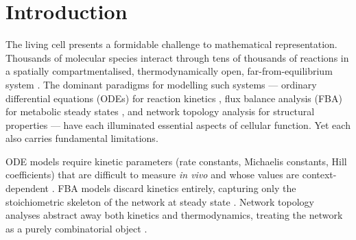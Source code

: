 \documentclass[11pt,twocolumn]{article}
\theoremstyle{plain}
\theoremstyle{definition}
\begin{document}
\begin{abstract}
We demonstrate that the contact state is the unique privileged state of a
biochemical network from which all other states can be derived by partition
depth inflation (perturbation). Disease states, drug responses, and metabolic
shifts correspond to departures from contact, measurable as increased partition
depth along specific edges. We present algorithms for computing contact maps
from pathway databases, for backward navigation through the causal chain of
perturbations, and for $\ell^1$-optimal restoration of the contact state. The
framework is applied to glycolysis, the TCA cycle, oxidative phosphorylation,
and EGFR/MAPK signalling, with explicit computation of S-entropy coordinates,
contact costs, perturbation responses, and restoration targets. All quantities
are derived from publicly available thermodynamic and kinetic data (KEGG,
Reactome, HMDB, BRENDA) with zero free parameters.

\end{abstract}

\section{Introduction}
\label{sec:introduction}

The living cell presents a formidable challenge to mathematical representation.
Thousands of molecular species interact through tens of thousands of reactions
in a spatially compartmentalised, thermodynamically open, far-from-equilibrium
system \cite{kitano2002systems, palsson2015systems}. The dominant paradigms for
modelling such systems --- ordinary differential equations (ODEs) for reaction
kinetics \cite{klipp2016systems, tyson2003sniffers}, flux balance analysis (FBA)
for metabolic steady states \cite{orth2010flux, schellenberger2011quantitative},
and network topology analysis for structural properties \cite{barabasi2004network,
jeong2000large} --- have each illuminated essential aspects of cellular function.
Yet each also carries fundamental limitations.

ODE models require kinetic parameters (rate constants, Michaelis constants,
Hill coefficients) that are difficult to measure \emph{in vivo} and whose
values are context-dependent \cite{cornishbowden2012fundamentals, schomburg2004brenda}.
FBA models discard kinetics entirely, capturing only the stoichiometric skeleton
of the network at steady state \cite{orth2010flux}. Network topology analyses
abstract away both kinetics and thermodynamics, treating the network as a purely
combinatorial object \cite{barabasi2004network, ravasz2002hierarchical}.
\end{document}
